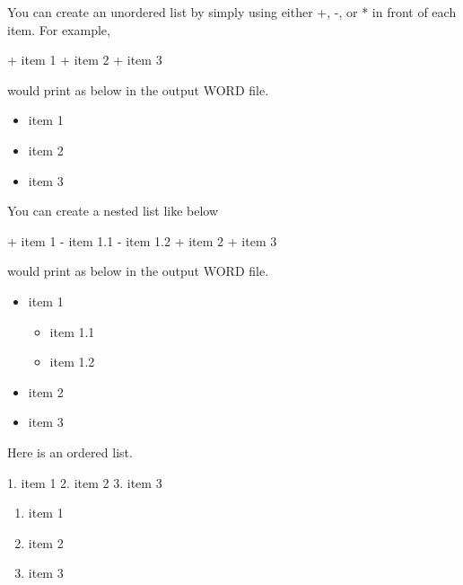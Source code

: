 \documentclass[
  letterpaper,
  DIV=11,
  numbers=noendperiod]{scrreprt}
\newenvironment{Shaded}{\begin{snugshade}}{\end{snugshade}}
\newcommand{\NormalTok}[1]{\textcolor[rgb]{0.00,0.23,0.31}{#1}}
\providecommand{\tightlist}{%
  \setlength{\itemsep}{0pt}\setlength{\parskip}{0pt}}\usepackage{longtable,booktabs,array}
\begin{document}
You can create an unordered list by simply using either +, -, or * in
front of each item. For example,

\begin{Shaded}
\begin{Highlighting}[]
\NormalTok{+ item 1}
\NormalTok{+ item 2}
\NormalTok{+ item 3}
\end{Highlighting}
\end{Shaded}

would print as below in the output WORD file.

\begin{itemize}
\tightlist
\item
  item 1
\item
  item 2
\item
  item 3
\end{itemize}

You can create a nested list like below

\begin{Shaded}
\begin{Highlighting}[]
\NormalTok{+ item 1}
\NormalTok{  {-} item 1.1}
\NormalTok{  {-} item 1.2}
\NormalTok{+ item 2}
\NormalTok{+ item 3}
\end{Highlighting}
\end{Shaded}

would print as below in the output WORD file.

\begin{itemize}
\tightlist
\item
  item 1

  \begin{itemize}
  \tightlist
  \item
    item 1.1
  \item
    item 1.2
  \end{itemize}
\item
  item 2
\item
  item 3
\end{itemize}

Here is an ordered list.

\begin{Shaded}
\begin{Highlighting}[]
\NormalTok{1. item 1}
\NormalTok{2. item 2}
\NormalTok{3. item 3}
\end{Highlighting}
\end{Shaded}

\begin{enumerate}
\def\labelenumi{\arabic{enumi}.}
\tightlist
\item
  item 1
\item
  item 2
\item
  item 3
\end{enumerate}
\end{document}
